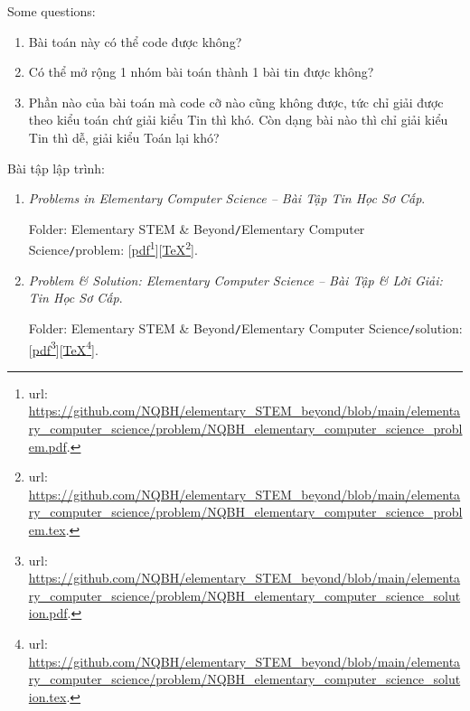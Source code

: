 \documentclass[12pt]{article}
\begin{document}
Some questions:
\begin{enumerate}
	\item Bài toán này có thể code được không?
	\item Có thể mở rộng 1 nhóm bài toán thành 1 bài tin được không?
	\item Phần nào của bài toán mà code cỡ nào cũng không được, tức chỉ giải được theo kiểu toán chứ giải kiểu Tin thì khó. Còn dạng bài nào thì chỉ giải kiểu Tin thì dễ, giải kiểu Toán lại khó?
\end{enumerate}
Bài tập lập trình:
\begin{enumerate}
	\item {\it Problems in Elementary Computer Science -- Bài Tập Tin Học Sơ Cấp}.
	
	Folder: {\sf Elementary STEM \& Beyond{\tt/}Elementary Computer Science{\tt/}problem}: [\href{https://github.com/NQBH/elementary_STEM_beyond/blob/main/elementary_computer_science/problem/NQBH_elementary_computer_science_problem.pdf}{pdf}\footnote{{\sc url}: \url{https://github.com/NQBH/elementary_STEM_beyond/blob/main/elementary_computer_science/problem/NQBH_elementary_computer_science_problem.pdf}.}][\href{https://github.com/NQBH/elementary_STEM_beyond/blob/main/elementary_computer_science/problem/NQBH_elementary_computer_science_problem.tex}{\TeX}\footnote{{\sc url}: \url{https://github.com/NQBH/elementary_STEM_beyond/blob/main/elementary_computer_science/problem/NQBH_elementary_computer_science_problem.tex}.}].
	\item {\it Problem \& Solution: Elementary Computer Science -- Bài Tập \& Lời Giải: Tin Học Sơ Cấp}.
	
	Folder: {\sf Elementary STEM \& Beyond{\tt/}Elementary Computer Science{\tt/}solution}: [\href{https://github.com/NQBH/elementary_STEM_beyond/blob/main/elementary_computer_science/problem/NQBH_elementary_computer_science_solution.pdf}{pdf}\footnote{{\sc url}: \url{https://github.com/NQBH/elementary_STEM_beyond/blob/main/elementary_computer_science/problem/NQBH_elementary_computer_science_solution.pdf}.}][\href{https://github.com/NQBH/elementary_STEM_beyond/blob/main/elementary_computer_science/problem/NQBH_elementary_computer_science_solution.tex}{\TeX}\footnote{{\sc url}: \url{https://github.com/NQBH/elementary_STEM_beyond/blob/main/elementary_computer_science/problem/NQBH_elementary_computer_science_solution.tex}.}].
\end{enumerate}

\end{document}
